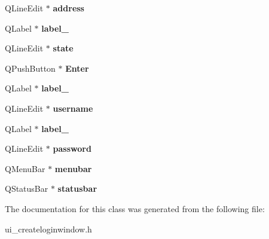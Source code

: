 \begin{DoxyCompactItemize}
Q\+Line\+Edit $\ast$ {\bfseries address}
\item 
\mbox{\label{class_ui___create_login_window_a2c428e6258f40595207014448747ab18}} 
Q\+Label $\ast$ {\bfseries label\+\_}
\item 
\mbox{\label{class_ui___create_login_window_a24e02f833981900bd15e0e240d9ecf80}} 
Q\+Line\+Edit $\ast$ {\bfseries state}
\item 
\mbox{\label{class_ui___create_login_window_a2e4df00fd8807ecdb1d9bbb3f26988a1}} 
Q\+Push\+Button $\ast$ {\bfseries Enter}
\item 
\mbox{\label{class_ui___create_login_window_a297f5534a49e3bbdea778e9ca43bbfac}} 
Q\+Label $\ast$ {\bfseries label\+\_}
\item 
\mbox{\label{class_ui___create_login_window_ad788d0a9040ea4d2bb87854ba9d4f4b2}} 
Q\+Line\+Edit $\ast$ {\bfseries username}
\item 
\mbox{\label{class_ui___create_login_window_a9bb84d4281a67fd3c70c7e98fd1cfae9}} 
Q\+Label $\ast$ {\bfseries label\+\_}
\item 
\mbox{\label{class_ui___create_login_window_a78f69c09ac760311dad88049d280e489}} 
Q\+Line\+Edit $\ast$ {\bfseries password}
\item 
\mbox{\label{class_ui___create_login_window_a59176a089e9f8302ca070413ccbc71b2}} 
Q\+Menu\+Bar $\ast$ {\bfseries menubar}
\item 
\mbox{\label{class_ui___create_login_window_aecbee9cd1aca0c11d0a4f60b2f4e97e6}} 
Q\+Status\+Bar $\ast$ {\bfseries statusbar}
\end{DoxyCompactItemize}


The documentation for this class was generated from the following file\+:\begin{DoxyCompactItemize}
\item 
ui\+\_\+createloginwindow.\+h\end{DoxyCompactItemize}
